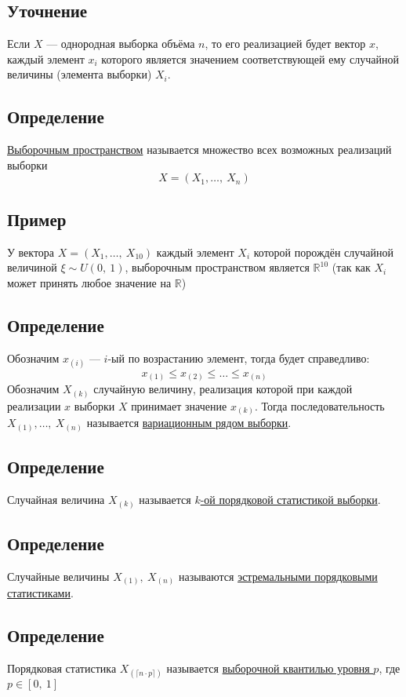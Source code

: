 \documentclass[12pt, a4paper]{article}
\begin{document}
\subsection*{Уточнение}
Если $X$ --- однородная выборка объёма $n$, то его реализацией будет вектор $x$, каждый элемент $x_i$ которого является значением соответствующей ему случайной величины (элемента выборки) $X_i$. 
\subsection*{Определение}
\underline{Выборочным пространством} называется множество всех возможных реализаций выборки\\
\[X = (X_1,\dots,\ X_n)\]
\subsection*{Пример}
У вектора $X = (X_1,\dots,\ X_{10})$ каждый элемент $X_i$ которой порождён случайной величиной $\xi\sim U(0,\ 1)$, выборочным пространством является $\mathbb{R}^{10}$ (так как $X_i$ может принять любое значение на $\mathbb{R}$)
\subsection*{Определение}
Обозначим $x_{(i)}$ --- $i$-ый по возрастанию элемент, тогда будет справедливо:
\[x_{(1)} \leq x_{(2)} \leq \dots \leq x_{(n)}\]
Обозначим $X_{(k)}$ случайную величину, реализация которой при каждой реализации $x$ выборки $X$ принимает значение $x_{(k)}$. Тогда последовательность $X_{(1)},\dots,\ X_{(n)}$ называется \underline{вариационным рядом выборки}.
\subsection*{Определение}
Случайная величина $X_{(k)}$ называется \underline{$k$-ой порядковой статистикой выборки}.
\subsection*{Определение}
Случайные величины $X_{(1)},\ X_{(n)}$ называются \underline{эстремальными порядковыми статистиками}.
\subsection*{Определение}
Порядковая статистика $X_{(\lceil n\cdot p \rceil)}$ называется \underline{выборочной квантилью уровня $p$}, где $p\in [0,\ 1]$
\end{document}
